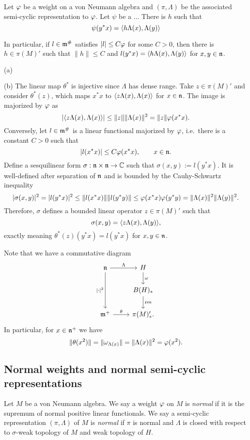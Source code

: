 \documentclass{../../../small}
\begin{document}
\begin{prop}
Let $\varphi$ be a weight on a von Neumann algebra and $(\pi,\Lambda)$ be the associated semi-cyclic representation to $\varphi$.
Let $\psi$ be a ...
There is $h$ such that
\[\psi(y^*x)=\langle h\Lambda(x),\Lambda(y)\rangle\]


In particular, if $l\in\mathfrak{m}^\#$ satisfies $|l|\le C\varphi$ for some $C>0$, then there is $h\in\pi(M)'$ such that $\|h\|\le C$ and $l(y^*x)=\langle h\Lambda(x),\Lambda(y)\rangle$ for $x,y\in\mathfrak{n}$.
\end{prop}
\begin{pf}
(a)

(b)
The linear map $\theta^*$ is injective since $\Lambda$ has dense range.
Take $z\in\pi(M)'$ and consider $\theta^*(z)$, which maps $x^*x$ to $\langle z\Lambda(x),\Lambda(x)\rangle$ for $x\in\mathfrak{n}$.
The image is majorized by $\varphi$ as
\[|\langle z\Lambda(x),\Lambda(x)\rangle|\le\|z\|\|\Lambda(x)\|^2=\|z\|\varphi(x^*x).\]
Conversely, let $l\in\mathfrak{m}^\#$ is a linear functional majorized by $\varphi$, i.e.~there is a constant $C>0$ such that
\[|l(x^*x)|\le C\varphi(x^*x),\qquad x\in\mathfrak{n}.\]
Define a sesquilinear form $\sigma:\mathfrak{n}\times\mathfrak{n}\to\mathbb{C}$ such that $\sigma(x,y):=l(y^*x)$.
It is well-defined after separation of $\mathfrak{n}$ and is bounded by the Cauhy-Schwartz inequality
\[|\sigma(x,y)|^2=|l(y^*x)|^2\le\|l(x^*x)\|\|l(y^*y)\|\le\varphi(x^*x)\varphi(y^*y)=\|\Lambda(x)\|^2\|\Lambda(y)\|^2.\]
Therefore, $\sigma$ defines a bounded linear operator $z\in\pi(M)'$ such that
\[\sigma(x,y)=\langle z\Lambda(x),\Lambda(y)\rangle,\]
exactly meaning $\theta^*(z)(y^*x)=l(y^*x)$ for $x,y\in\mathfrak{n}$.
\end{pf}

Note that we have a commutative diagram
\[\begin{tikzcd}
\fn \ar{r}{\Lambda}\ar[swap]{dd}{|\cdot|^2} & H \ar{d}{\omega} \\
& B(H)_* \ar{d}{\mathrm{res}}\\
\fm^+ \ar{r}{\theta} & \pi(M)'_*.
\end{tikzcd}\]
In particular, for $x\in\mathfrak{n}^+$ we have
\[\|\theta(x^2)\|=\|\omega_{\Lambda(x)}\|=\|\Lambda(x)\|^2=\varphi(x^2).\]





\subsection{Normal weights and normal semi-cyclic representations}




\begin{defn}
Let $M$ be a von Neumann algebra.
We say a weight $\varphi$ on $M$ is \emph{normal} if it is the supremum of normal positive linear functionals.
We say a semi-cyclic representation $(\pi,\Lambda)$ of $M$ is \emph{normal} if $\pi$ is normal and $\Lambda$ is closed with respect to $\sigma$-weak topology of $M$ and weak topology of $H$.
\end{defn}
\end{document}
